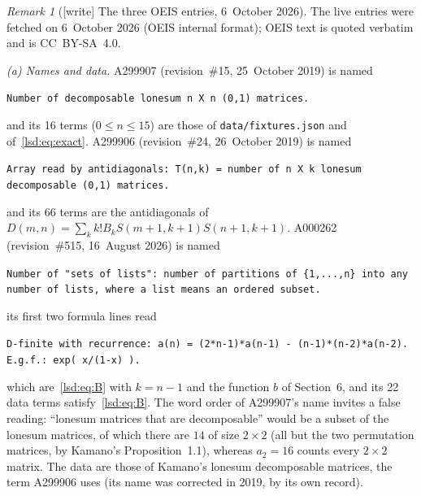\documentclass[11pt]{article}
\theoremstyle{remark}\newtheorem{remark}{Remark}
\newcommand{\file}[1]{\nolinkurl{#1}}
\begin{document}
\begin{remark}[{[write]} The three OEIS entries, 6~October 2026]\label{lsd:rem:oeis}
The live entries were fetched on 6~October 2026 (OEIS internal format); OEIS
text is quoted verbatim and is CC~BY-SA~4.0.

\emph{(a) Names and data.} A299907 (revision~\#15, 25~October 2019) is named
\begin{center}\small
\parbox{0.92\textwidth}{\raggedright\texttt{Number of decomposable lonesum n X n (0,1) matrices.}}
\end{center}
and its 16 terms ($0\le n\le15$) are those of \file{data/fixtures.json}
and of~\eqref{lsd:eq:exact}. A299906 (revision~\#24, 26~October 2019) is named
\begin{center}\small
\parbox{0.92\textwidth}{\raggedright\texttt{Array read by antidiagonals: T(n,k) = number of n X k lonesum decomposable (0,1) matrices.}}
\end{center}
and its 66 terms are the antidiagonals of $D(m,n)=\sum_kk!B_kS(m+1,k+1)S(n+1,k+1)$.
A000262 (revision~\#515, 16~August 2026) is named
\begin{center}\small
\parbox{0.92\textwidth}{\raggedright\texttt{Number of "sets of lists": number of partitions of \{1,...,n\} into any number of lists, where a list means an ordered subset.}}
\end{center}
its first two formula lines read
\begin{center}\small
\parbox{0.92\textwidth}{\raggedright\texttt{D-finite with recurrence: a(n) = (2*n-1)*a(n-1) - (n-1)*(n-2)*a(n-2).}\\
\texttt{E.g.f.: exp( x/(1-x) ).}}
\end{center}
which are~\eqref{lsd:eq:B} with $k=n-1$
and the function $b$ of Section~6, and its 22 data terms satisfy~\eqref{lsd:eq:B}.
The word order of A299907's name invites a false reading: ``lonesum matrices
that are decomposable'' would be a subset of the lonesum matrices, of which
there are $14$ of size $2\times2$ (all but the two permutation matrices, by
Kamano's Proposition~1.1), whereas $a_2=16$ counts every $2\times2$ matrix.
The data are those of Kamano's lonesum decomposable matrices, the term
A299906 uses (its name was corrected in 2019, by its own record).


\end{remark}
\end{document}
